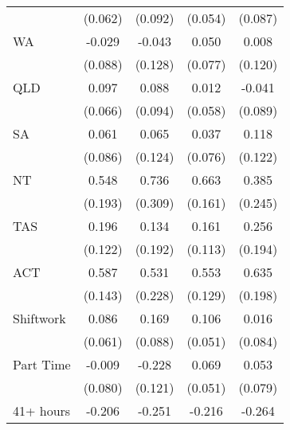 {\begin{tabular}{l*{4}{c}}
                    &     (0.062)         &     (0.092)         &     (0.054)         &     (0.087)         \\
WA                  &      -0.029         &      -0.043         &       0.050         &       0.008         \\
                    &     (0.088)         &     (0.128)         &     (0.077)         &     (0.120)         \\
QLD                 &       0.097         &       0.088         &       0.012         &      -0.041         \\
                    &     (0.066)         &     (0.094)         &     (0.058)         &     (0.089)         \\
SA                  &       0.061         &       0.065         &       0.037         &       0.118         \\
                    &     (0.086)         &     (0.124)         &     (0.076)         &     (0.122)         \\
NT                  &       0.548\sym{***}&       0.736\sym{**} &       0.663\sym{***}&       0.385         \\
                    &     (0.193)         &     (0.309)         &     (0.161)         &     (0.245)         \\
TAS                 &       0.196         &       0.134         &       0.161         &       0.256         \\
                    &     (0.122)         &     (0.192)         &     (0.113)         &     (0.194)         \\
ACT                 &       0.587\sym{***}&       0.531\sym{**} &       0.553\sym{***}&       0.635\sym{***}\\
                    &     (0.143)         &     (0.228)         &     (0.129)         &     (0.198)         \\
Shiftwork           &       0.086         &       0.169\sym{*}  &       0.106\sym{**} &       0.016         \\
                    &     (0.061)         &     (0.088)         &     (0.051)         &     (0.084)         \\
Part Time           &      -0.009         &      -0.228\sym{*}  &       0.069         &       0.053         \\
                    &     (0.080)         &     (0.121)         &     (0.051)         &     (0.079)         \\
41+ hours           &      -0.206\sym{***}&      -0.251\sym{***}&      -0.216\sym{***}&      -0.264\sym{***}\\

\end{tabular}}
